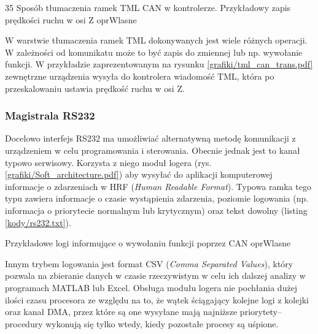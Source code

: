 	{35}
	{Sposób tłumaczenia ramek TML CAN w kontrolerze. Przykładowy zapis prędkości ruchu w osi Z}
	{oprWlasne}
	
W warstwie tłumaczenia ramek TML dokonywanych jest wiele różnych operacji. W zależności od komunikatu może to być zapis do zmiennej lub np. wywołanie funkcji. W przykładzie zaprezentowanym na rysunku \ref{grafiki/tml_can_trans.pdf} zewnętrzne urządzenia wysyła do kontrolera wiadomość TML, która po przeskalowaniu ustawia prędkość ruchu w osi Z.

\subsubsection{Magistrala RS232}
\label{ss:hwrs232}

Docelowo interfejs RS232 ma umożliwiać alternatywną metodę komunikacji \linebreak z urządzeniem w celu programowania i sterowania. Obecnie jednak jest to kanał typowo serwisowy. Korzysta z niego moduł logera (rys. \ref{grafiki/Soft_architecture.pdf}) aby wysyłać do aplikacji komputerowej informacje o zdarzeniach w HRF ({\it Human Readable Format}). Typowa ramka tego typu zawiera informacje o czasie wystąpienia zdarzenia, poziomie logowania (np. informacja o priorytecie normalnym lub krytycznym) oraz tekst dowolny (listing \ref{kody/rs232.txt}). 

		   {}
		   {Przykładowe logi informujące o wywołaniu funkcji poprzez CAN}
		   {oprWlasne}
		   
Innym trybem logowania jest format CSV ({\it Comma Separated Values}), który pozwala na zbieranie danych w czasie rzeczywistym w celu ich dalszej analizy w programach MATLAB lub Excel. Obsługa modułu logera nie pochłania dużej ilości czasu procesora ze względu na to, że wątek ściągający kolejne logi z kolejki oraz kanał DMA, przez które są one wysyłane mają najniższe priorytety-- procedury wykonują się tylko wtedy, kiedy pozostałe procesy są uśpione.



\clearpage







